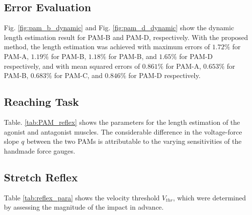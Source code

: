 \vspace{1cm}

\subsection{Error Evaluation} 
Fig. \ref{fig:pam_b_dynamic} and Fig. \ref{fig:pam_d_dynamic} show the dynamic length estimation result for PAM-B and PAM-D, respectively.
With the proposed method, the length estimation was achieved with maximum errors of $1.72\%$ for PAM-A, $1.19\%$ for PAM-B, $1.18\%$ for PAM-B, and  $1.65\%$ for PAM-D respectively, and with mean squared errors of $0.861\%$ for PAM-A, $0.653\%$ for PAM-B, $0.683\%$ for PAM-C, and $0.846\%$ for PAM-D respectively.

\subsection{Reaching Task}
Table. \ref{tab:PAM_reflex} shows the parameters for the length estimation of the agonist and antagonist muscles. The considerable difference in the voltage-force slope $q$  between the two PAMs is attributable to the varying sensitivities of the handmade force gauges.

\begin{table}[H]
    \centering
    \caption{Parameters for Length Estimation} 
    \label{tab:PAM_reflex}
\end{table}


\subsection{Stretch Reflex}
Table \ref{tab:reflex_para} shows the velocity threshold $V_{thr}$, which were determined by assessing the magnitude of the impact in advance. 

